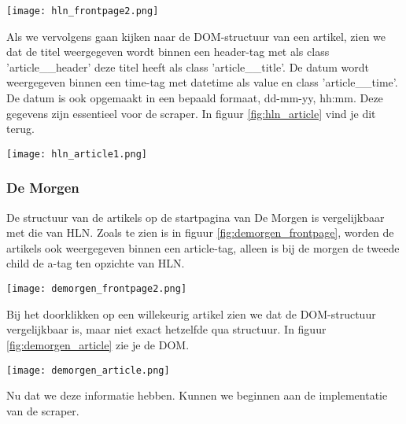 \begin{center}
    \texttt{[image: hln\_frontpage2.png]}
    \label{fig:hln_frontpage}
\end{center}

Als we vervolgens gaan kijken naar de DOM-structuur van een artikel, zien we dat de titel weergegeven wordt binnen een header-tag met als class 'article\_\_header' deze titel heeft als class 'article\_\_title'. De datum wordt weergegeven binnen een time-tag met datetime als value en class 'article\_\_time'. De datum is ook opgemaakt in een bepaald formaat, dd-mm-yy, hh:mm. Deze gegevens zijn essentieel voor de scraper. In figuur \ref{fig:hln_article} vind je dit terug. \\

\begin{center}
    \texttt{[image: hln\_article1.png]}
    \label{fig:hln_article}
\end{center}

\subsubsection{De Morgen}
De structuur van de artikels op de startpagina van De Morgen is vergelijkbaar met die van HLN. Zoals te zien is in figuur \ref{fig:demorgen_frontpage}, worden de artikels ook weergegeven binnen een article-tag, alleen is bij de morgen de tweede child de a-tag ten opzichte van HLN.

\begin{center}
    \texttt{[image: demorgen\_frontpage2.png]}
    \label{fig:demorgen_frontpage}
\end{center}

Bij het doorklikken op een willekeurig artikel zien we dat de DOM-structuur vergelijkbaar is, maar niet exact hetzelfde qua structuur. In figuur \ref{fig:demorgen_article} zie je de DOM.

\begin{center}
    \texttt{[image: demorgen\_article.png]}
    \label{fig:demorgen_article} 
\end{center}

Nu dat we deze informatie hebben. Kunnen we beginnen aan de implementatie van de scraper. 

